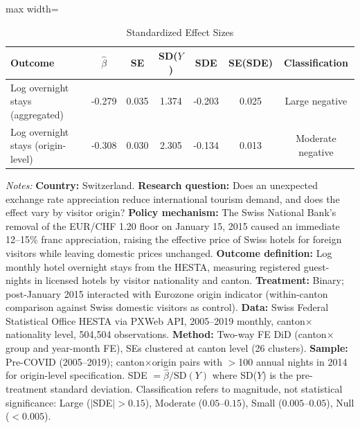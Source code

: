 \begin{table}[t]
\begin{threeparttable}
\centering
\caption{Standardized Effect Sizes}
\label{tab:sde}
\begin{adjustbox}{max width=\textwidth}
\begin{tabular}{lcccccc}
\toprule
Outcome & $\hat{\beta}$ & SE & SD($Y$) & SDE & SE(SDE) & Classification \\
\midrule
Log overnight stays (aggregated) & -0.279 & 0.035 & 1.374 & -0.203 & 0.025 & Large negative \\
Log overnight stays (origin-level) & -0.308 & 0.030 & 2.305 & -0.134 & 0.013 & Moderate negative \\
\bottomrule
\end{tabular}
\end{adjustbox}
\begin{tablenotes}
\footnotesize
\item \textit{Notes:} \textbf{Country:} Switzerland. \textbf{Research question:} Does an unexpected exchange rate appreciation reduce international tourism demand, and does the effect vary by visitor origin? \textbf{Policy mechanism:} The Swiss National Bank's removal of the EUR/CHF 1.20 floor on January 15, 2015 caused an immediate 12--15\% franc appreciation, raising the effective price of Swiss hotels for foreign visitors while leaving domestic prices unchanged. \textbf{Outcome definition:} Log monthly hotel overnight stays from the HESTA, measuring registered guest-nights in licensed hotels by visitor nationality and canton. \textbf{Treatment:} Binary; post-January 2015 interacted with Eurozone origin indicator (within-canton comparison against Swiss domestic visitors as control). \textbf{Data:} Swiss Federal Statistical Office HESTA via PXWeb API, 2005--2019 monthly, canton$\times$nationality level, 504,504 observations. \textbf{Method:} Two-way FE DiD (canton$\times$group and year-month FE), SEs clustered at canton level (26 clusters). \textbf{Sample:} Pre-COVID (2005--2019); canton$\times$origin pairs with $>$100 annual nights in 2014 for origin-level specification. SDE $= \hat{\beta} / \text{SD}(Y)$ where SD($Y$) is the pre-treatment standard deviation. Classification refers to magnitude, not statistical significance: Large ($|$SDE$| > 0.15$), Moderate ($0.05$--$0.15$), Small ($0.005$--$0.05$), Null ($< 0.005$).
\end{tablenotes}
\end{threeparttable}
\end{table}
